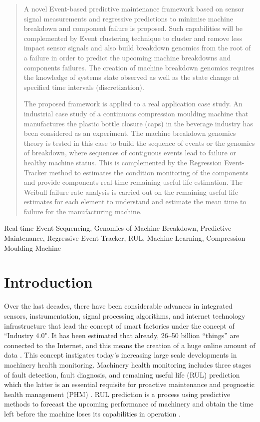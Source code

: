 \documentclass[conference]{IEEEtran}
\begin{document}
\begin{abstract}
A novel Event-based predictive maintenance framework based on sensor signal measurements and regressive predictions to minimise machine breakdown and component failure is proposed. Such capabilities will be complemented by Event clustering technique to cluster and remove less impact sensor signals and also build breakdown genomics from the root of a failure in order to predict the upcoming machine breakdowns and components failures.  The creation of machine breakdown genomics requires the knowledge of systems state observed as well as the state change at specified time intervals (discretization).

The proposed framework is applied to a real application case study. An industrial case study of a continuous compression moulding machine that manufactures the plastic bottle closure (caps) in the beverage industry has been considered as an experiment. The machine breakdown genomics theory is tested in this case to build the sequence of events or the genomics of breakdown, where sequences of contiguous events lead to failure or healthy machine status. This is complemented by the Regression Event-Tracker method to estimates the condition monitoring of the components and provide components real-time remaining useful life estimation. The Weibull failure rate analysis is carried out on the remaining useful life estimates for each element to understand and estimate the mean time to failure for the manufacturing machine.
\end{abstract}

\begin{IEEEkeywords}
Real-time Event Sequencing, Genomics of Machine Breakdown, Predictive Maintenance, Regressive Event Tracker, RUL, Machine Learning, Compression Moulding Machine
\end{IEEEkeywords}


\section{Introduction}
\label{sec:Introduction}
Over the last decades, there have been considerable advances in integrated sensors, instrumentation, signal processing algorithms, and internet technology infrastructure that lead the concept of smart factories under the concept of ``Industry 4.0". It has been estimated that already, \numrange{26}{50} billion “things” are connected to the Internet, and this means the creation of a huge online amount of data \cite{Kumar2019}. This concept instigates today’s increasing large scale developments in machinery health monitoring.  Machinery health monitoring includes three stages of fault detection, fault diagnosis, and remaining useful life (RUL) prediction which the latter is an essential requisite for proactive maintenance and prognostic health management (PHM) \cite{Jin2019}. RUL prediction is a process using predictive methods to forecast the upcoming performance of machinery and obtain the time left before the machine loses its capabilities in operation \cite{Zhao2015}.
\end{document}

